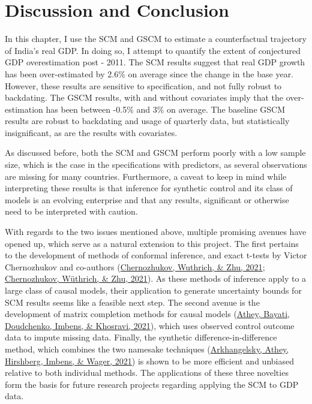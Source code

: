 \documentclass[12pt,nobind, a4paper]{reedthesis}
\begin{document}
 \hypertarget{discussion-and-conclusion}{%
 \section{Discussion and Conclusion}\label{discussion-and-conclusion}}

 In this chapter, I use the SCM and GSCM to estimate a counterfactual trajectory of India's real GDP. In doing so, I attempt to quantify the extent of conjectured GDP overestimation post - 2011. The SCM results suggest that real GDP growth has been over-estimated by 2.6\% on average since the change in the base year. However, these results are sensitive to specification, and not fully robust to backdating. The GSCM results, with and without covariates imply that the over-estimation has been between -0.5\% and 3\% on average. The baseline GSCM results are robust to backdating and usage of quarterly data, but statistically insignificant, as are the results with covariates.
 \linebreak

 As discussed before, both the SCM and GSCM perform poorly with a low sample size, which is the case in the specifications with predictors, as several observations are missing for many countries. Furthermore, a caveat to keep in mind while interpreting these results is that inference for synthetic control and its class of models is an evolving enterprise and that any results, significant or otherwise need to be interpreted with caution.
 \linebreak

 With regards to the two issues mentioned above, multiple promising avenues have opened up, which serve as a natural extension to this project. The first pertains to the development of methods of conformal inference, and exact t-tests by Victor Chernozhukov and co-authors (\protect\hyperlink{ref-chernozhukov_t-test_2021}{Chernozhukov, Wuthrich, \& Zhu, 2021}; \protect\hyperlink{ref-chernozhukov_exact_2021}{Chernozhukov, Wüthrich, \& Zhu, 2021}). As these methods of inference apply to a large class of causal models, their application to generate uncertainty bounds for SCM results seems like a feasible next step. The second avenue is the development of matrix completion methods for causal models (\protect\hyperlink{ref-athey_matrix_2021}{Athey, Bayati, Doudchenko, Imbens, \& Khosravi, 2021}), which uses observed control outcome data to impute missing data. Finally, the synthetic difference-in-difference method, which combines the two namesake techniques (\protect\hyperlink{ref-arkhangelsky_synthetic_2021}{Arkhangelsky, Athey, Hirshberg, Imbens, \& Wager, 2021}) is shown to be more efficient and unbiased relative to both individual methods. The applications of these three novelties form the basis for future research projects regarding applying the SCM to GDP data.
\end{document}
